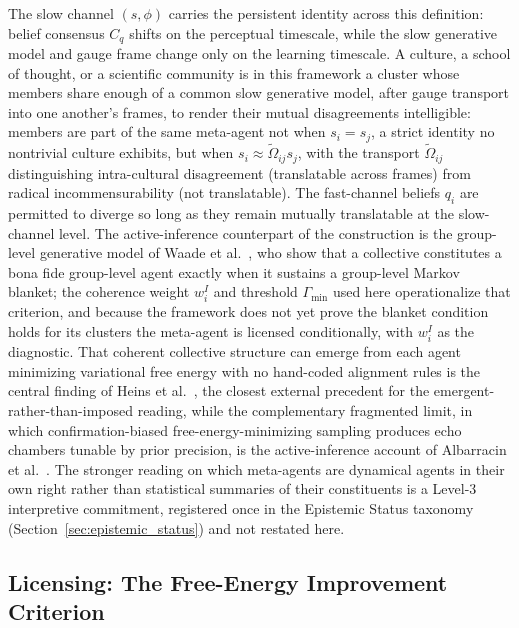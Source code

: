 \documentclass[11pt]{article}
\begin{document}
The slow channel $(s, \phi)$ carries the persistent identity across this definition: belief consensus $C_q$ shifts on the perceptual timescale, while the slow generative model and gauge frame change only on the learning timescale. A culture, a school of thought, or a scientific community is in this framework a cluster whose members share enough of a common slow generative model, after gauge transport into one another's frames, to render their mutual disagreements intelligible: members are part of the same meta-agent not when $s_i = s_j$, a strict identity no nontrivial culture exhibits, but when $s_i \approx \tilde\Omega_{ij} s_j$, with the transport $\tilde\Omega_{ij}$ distinguishing intra-cultural disagreement (translatable across frames) from radical incommensurability (not translatable). The fast-channel beliefs $q_i$ are permitted to diverge so long as they remain mutually translatable at the slow-channel level. The active-inference counterpart of the construction is the group-level generative model of Waade et al.~\cite{waade2025asone}, who show that a collective constitutes a bona fide group-level agent exactly when it sustains a group-level Markov blanket; the coherence weight $w_i^I$ and threshold $\Gamma_{\min}$ used here operationalize that criterion, and because the framework does not yet prove the blanket condition holds for its clusters the meta-agent is licensed conditionally, with $w_i^I$ as the diagnostic. That coherent collective structure can emerge from each agent minimizing variational free energy with no hand-coded alignment rules is the central finding of Heins et al.~\cite{heins2024collective}, the closest external precedent for the emergent-rather-than-imposed reading, while the complementary fragmented limit, in which confirmation-biased free-energy-minimizing sampling produces echo chambers tunable by prior precision, is the active-inference account of Albarracin et al.~\cite{albarracin2022epistemic}. The stronger reading on which meta-agents are dynamical agents in their own right rather than statistical summaries of their constituents is a Level-3 interpretive commitment, registered once in the Epistemic Status taxonomy (Section~\ref{sec:epistemic_status}) and not restated here.

\subsection{Licensing: The Free-Energy Improvement Criterion}
\label{sec:meta_agent_variational}
\end{document}
